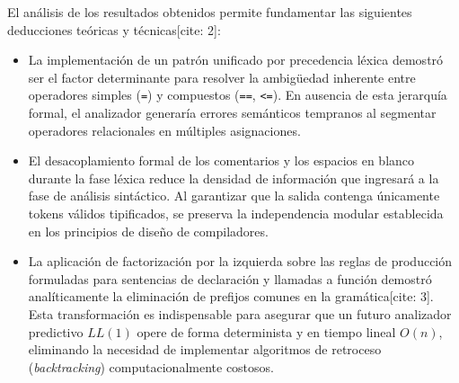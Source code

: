 \documentclass[letterpaper,12pt,oneside]{article}
\begin{document}
El análisis de los resultados obtenidos permite fundamentar las siguientes deducciones teóricas y técnicas[cite: 2]:

\begin{itemize}
    \item La implementación de un patrón unificado por precedencia léxica demostró ser el factor determinante para resolver la ambigüedad inherente entre operadores simples (\texttt{=}) y compuestos (\texttt{==}, \texttt{<=}). En ausencia de esta jerarquía formal, el analizador generaría errores semánticos tempranos al segmentar operadores relacionales en múltiples asignaciones.
    \item El desacoplamiento formal de los comentarios y los espacios en blanco durante la fase léxica reduce la densidad de información que ingresará a la fase de análisis sintáctico. Al garantizar que la salida contenga únicamente tokens válidos tipificados, se preserva la independencia modular establecida en los principios de diseño de compiladores.
    \item La aplicación de factorización por la izquierda sobre las reglas de producción formuladas para sentencias de declaración y llamadas a función demostró analíticamente la eliminación de prefijos comunes en la gramática[cite: 3]. Esta transformación es indispensable para asegurar que un futuro analizador predictivo $LL(1)$ opere de forma determinista y en tiempo lineal $O(n)$, eliminando la necesidad de implementar algoritmos de retroceso (\textit{backtracking}) computacionalmente costosos.
\end{itemize}

\printbibliography
\end{document}

